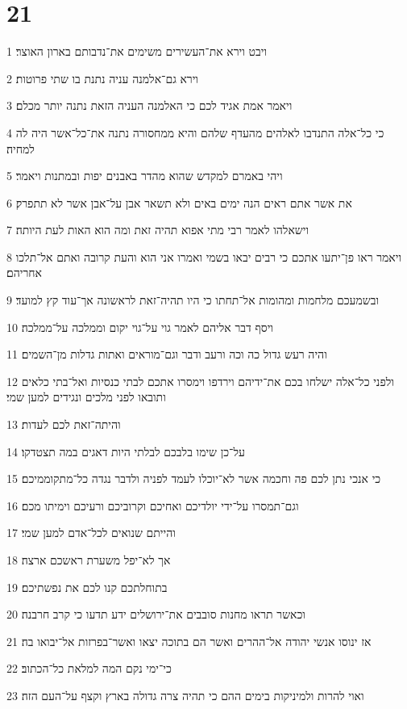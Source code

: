 \chapter{21}

\par 1 ויבט וירא את־העשירים משימים את־נדבותם בארון האוצר׃
\par 2 וירא גם־אלמנה עניה נתנת בו שתי פרוטות׃
\par 3 ויאמר אמת אגיד לכם כי האלמנה העניה הזאת נתנה יותר מכלם׃
\par 4 כי כל־אלה התנדבו לאלהים מהעדף שלהם והיא ממחסורה נתנה את־כל־אשר היה לה למחיה׃
\par 5 ויהי באמרם למקדש שהוא מהדר באבנים יפות ובמתנות ויאמר׃
\par 6 את אשר אתם ראים הנה ימים באים ולא תשאר אבן על־אבן אשר לא תתפרק׃
\par 7 וישאלהו לאמר רבי מתי אפוא תהיה זאת ומה הוא האות לעת היותה׃
\par 8 ויאמר ראו פן־יתעו אתכם כי רבים יבאו בשמי ואמרו אני הוא והעת קרובה ואתם אל־תלכו אחריהם׃
\par 9 ובשמעכם מלחמות ומהומות אל־תחתו כי היו תהיה־זאת לראשונה אך־עוד קץ למועד׃
\par 10 ויסף דבר אליהם לאמר גוי על־גוי יקום וממלכה על־ממלכה׃
\par 11 והיה רעש גדול כה וכה ורעב ודבר וגם־מוראים ואתות גדלות מן־השמים׃
\par 12 ולפני כל־אלה ישלחו בכם את־ידיהם וירדפו וימסרו אתכם לבתי כנסיות ואל־בתי כלאים ותובאו לפני מלכים ונגידים למען שמי׃
\par 13 והיתה־זאת לכם לעדות׃
\par 14 על־כן שימו בלבכם לבלתי היות דאגים במה תצטדקו׃
\par 15 כי אנכי נתן לכם פה וחכמה אשר לא־יוכלו לעמד לפניה ולדבר נגדה כל־מתקוממיכם׃
\par 16 וגם־תמסרו על־ידי יולדיכם ואחיכם וקרוביכם ורעיכם וימיתו מכם׃
\par 17 והייתם שנואים לכל־אדם למען שמי׃
\par 18 אך לא־יפל משערת ראשכם ארצה׃
\par 19 בתוחלתכם קנו לכם את נפשתיכם׃
\par 20 וכאשר תראו מחנות סובבים את־ירושלים ידע תדעו כי קרב חרבנה׃
\par 21 אז ינוסו אנשי יהודה אל־ההרים ואשר הם בתוכה יצאו ואשר־בפרזות אל־יבואו בה׃
\par 22 כי־ימי נקם המה למלאת כל־הכתוב׃
\par 23 ואוי להרות ולמיניקות בימים ההם כי תהיה צרה גדולה בארץ וקצף על־העם הזה׃
